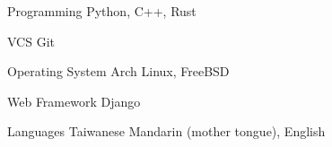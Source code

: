 

\begin{cvskills}


  \cvskill
    {Programming}
    {Python, C++, Rust}


  \cvskill
    {VCS}
    {Git}

  \cvskill
    {Operating System}
    {Arch Linux, FreeBSD}

  \cvskill
    {Web Framework}
    {Django}

  \cvskill
    {Languages}
    {Taiwanese Mandarin (mother tongue), English}


\end{cvskills}
